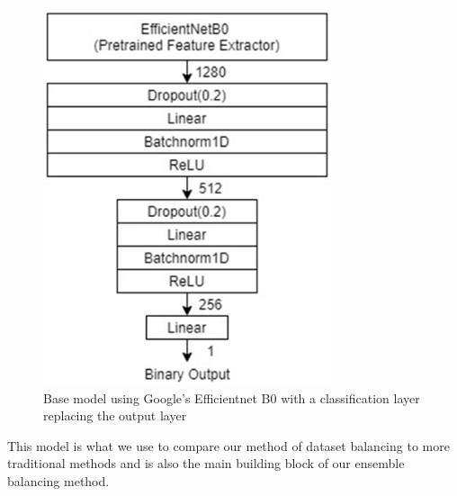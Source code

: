 \documentclass[conference]{IEEEtran}
\begin{document}
\begin{figure}[tp]
  \centering
  \includegraphics[scale=0.3]{base_model.png}
  \caption{Base model using Google's Efficientnet B0 with a classification
    layer replacing the output layer}
  \label{base_model}
\end{figure}

This model is what we use to compare our method of dataset balancing to more
traditional methods and is also the main building block of our ensemble
balancing method.
\end{document}
